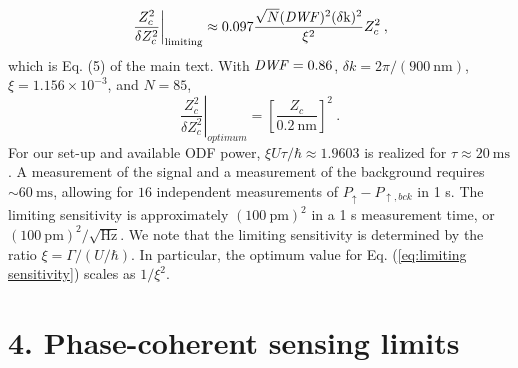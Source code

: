 \documentclass[aps,prl,onecolumn,superscriptaddress,floatfix]{revtex4-1}
\begin{document}
\begin{equation}
\left.\frac{Z_{c}^{2}}{\delta Z_{c}^{2}}\right|_{\mathrm{limiting}}\approx 0.097 \frac{\sqrt{N}(\rm{\it{DWF}})^2 (\delta k)^2}{\xi^2} Z_c^2\:,
\end{equation}
which is Eq. (5) of the main text.
With $\rm{\it{DWF}}=0.86$, $\delta k=2\pi/\left(900\:\mathrm{nm}\right)$,
$\xi=1.156\times10^{-3}$, and $N=85$,
\begin{equation}
\left.\frac{Z_{c}^{2}}{\delta Z_{c}^{2}}\right|_{optimum}=\left[\frac{Z_{c}}{0.2\:\mathrm{nm}}\right]^{2}\:.\label{eq:26.1 Z_c^2}
\end{equation}
For our set-up and available ODF power, $\xi U\tau/\hbar\approx1.9603$
is realized for $\tau\approx20\:\mathrm{ms}$. A measurement of the
signal and a measurement of the background requires $\sim60\:\mathrm{ms}$, allowing
for $16$ independent measurements of $ P_{\uparrow} - P_{\uparrow,bck}$
in 1 s. The limiting sensitivity is approximately $\left(100\:\mathrm{pm}\right)^{2}$
in a 1 s measurement time, or $\left(100\:\mathrm{pm}\right)^{2}/\sqrt{\mathrm{Hz}}$.
We note that the limiting sensitivity is determined by the ratio $\xi=\Gamma/\left(U/\hbar\right)$.
In particular, the optimum value for Eq. (\ref{eq:limiting sensitivity})
scales as $1/\xi^{2}$.

\section{4. Phase-coherent sensing limits}
\end{document}
